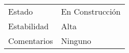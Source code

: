 \begin{table}[H]
\begin{tabular}{ll}
		Estado       & En Construcci\'on                                                                                                                                                                                                      \\
		Estabilidad  & Alta                                                                                                                                                                                                                 \\
		Comentarios  & Ninguno                                                                                                                                                                                                             
	\end{tabular}
\end{table}

